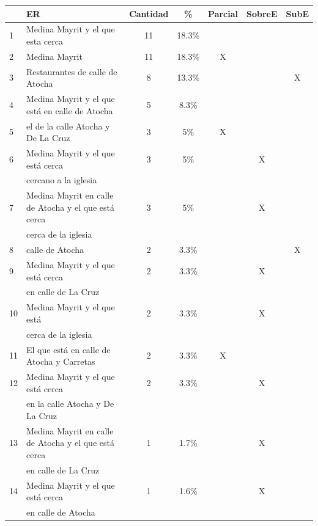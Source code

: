 \begin{table}[h]
{\footnotesize
\begin{center}
\begin{tabular}{|l|l|c|c|c|c|c|}
\hline
&ER 					      & Cantidad &  \% & Parcial & SobreE & SubE\\ \hline \hline
1&Medina Mayrit y el que esta cerca        &	11	&	18.3\% &  &  &\\ \hline


2&Medina Mayrit			&11		&	18.3\%	&X& &\\  \hline


3&Restaurantes de calle de Atocha				&	8  &	13.3\%	&& &X\\ \hline

4&Medina Mayrit y el que est\'a en calle de Atocha	      &5		&	8.3\%	&&&\\ \hline

5&el de la calle Atocha y De La Cruz       &	3  &	5\%	&X & &\\  \hline
6&Medina Mayrit y el que est\'a cerca				&		3 &	5\%  & &X&\\
&cercano a la iglesia				&	  &	&&&\\ \hline
7&Medina Mayrit en calle de Atocha y el que est\'a cerca				& 3  &	5\%	&&X&\\
&cerca de la iglesia				&	  &		&&&\\ \hline

8&calle de Atocha				&	2  &	3.3\%	&&&X\\ \hline

9&Medina Mayrit y el que est\'a cerca			&2  &	3.3\%	&&X&\\
&en calle de La Cruz	&	  &		&&&\\ \hline

10&Medina Mayrit y el que est\'a 	&	2	&	3.3\%  &&X&\\
&cerca de la iglesia				&	  &	&&&\\ \hline
11&El que est\'a en calle de Atocha y Carretas 					&	2  &	3.3\%	&X&&\\ \hline
12&Medina Mayrit y el que est\'a cerca				&	2	&	3.3\%  &&X&\\
&en la calle Atocha y De La Cruz        &	  &	&&&\\ \hline
13&Medina Mayrit en calle de Atocha y el que est\'a cerca			&1  &	1.7\%	&&X&\\
&en calle de La Cruz	&	  &		&&&\\ \hline

14&Medina Mayrit y el que est\'a cerca			&1  &	1.6\%	&&X&\\
&en calle de Atocha	&	 &		&&&\\ \hline


\end{tabular}
\end{center}}
\end{table}
